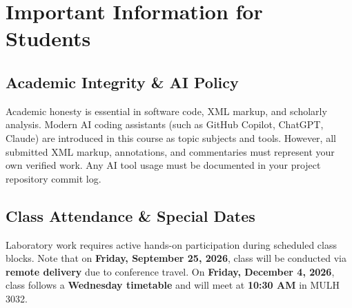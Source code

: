 \documentclass[12pt,oncampus]{article}
\begin{document}
\begin{stfxevaluation}






\end{stfxevaluation}

\section*{Important Information for Students}

\subsection*{Academic Integrity \& AI Policy}

Academic honesty is essential in software code, XML markup, and scholarly analysis. Modern AI coding assistants (such as GitHub Copilot, ChatGPT, Claude) are introduced in this course as topic subjects and tools. However, all submitted XML markup, annotations, and commentaries must represent your own verified work. Any AI tool usage must be documented in your project repository commit log.

\subsection*{Class Attendance \& Special Dates}

Laboratory work requires active hands-on participation during scheduled class blocks. Note that on \textbf{Friday, September 25, 2026}, class will be conducted via \textbf{remote delivery} due to conference travel. On \textbf{Friday, December 4, 2026}, class follows a \textbf{Wednesday timetable} and will meet at \textbf{10:30 AM} in MULH 3032.
\end{document}
